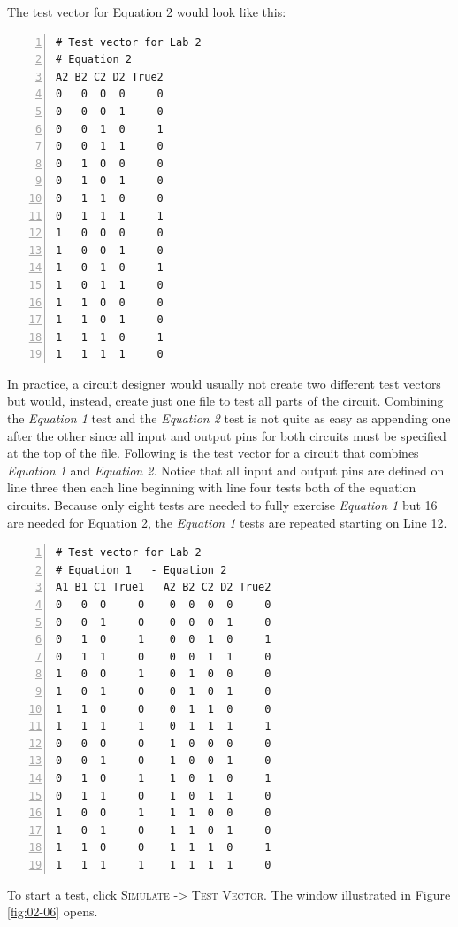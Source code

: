 The test vector for Equation 2 would look like this:

\begin{Verbatim}[frame=lines,
								 numbers=left,
								 xleftmargin=10mm,
								 xrightmargin=10mm]
# Test vector for Lab 2
# Equation 2
A2 B2 C2 D2 True2
0   0  0  0     0
0   0  0  1     0
0   0  1  0     1
0   0  1  1     0
0   1  0  0     0
0   1  0  1     0
0   1  1  0     0
0   1  1  1     1
1   0  0  0     0
1   0  0  1     0
1   0  1  0     1
1   0  1  1     0
1   1  0  0     0
1   1  0  1     0
1   1  1  0     1
1   1  1  1     0
\end{Verbatim}

In practice, a circuit designer would usually not create two different test vectors but would, instead, create just one file to test all parts of the circuit. Combining the \textit{Equation 1} test and the \textit{Equation 2} test is not quite as easy as appending one after the other since all input and output pins for both circuits must be specified at the top of the file. Following is the test vector for a circuit that combines \textit{Equation 1} and \textit{Equation 2}. Notice that all input and output pins are defined on line three then each line beginning with line four tests both of the equation circuits. Because only eight tests are needed to fully exercise \textit{Equation 1} but 16 are needed for Equation 2, the \textit{Equation 1} tests are repeated starting on Line 12.

\begin{Verbatim}[frame=lines,
								 numbers=left,
								 xleftmargin=10mm,
								 xrightmargin=10mm]
# Test vector for Lab 2
# Equation 1   - Equation 2
A1 B1 C1 True1   A2 B2 C2 D2 True2
0   0  0     0    0  0  0  0     0
0   0  1     0    0  0  0  1     0
0   1  0     1    0  0  1  0     1
0   1  1     0    0  0  1  1     0
1   0  0     1    0  1  0  0     0
1   0  1     0    0  1  0  1     0
1   1  0     0    0  1  1  0     0
1   1  1     1    0  1  1  1     1
0   0  0     0    1  0  0  0     0
0   0  1     0    1  0  0  1     0
0   1  0     1    1  0  1  0     1
0   1  1     0    1  0  1  1     0
1   0  0     1    1  1  0  0     0
1   0  1     0    1  1  0  1     0
1   1  0     0    1  1  1  0     1
1   1  1     1    1  1  1  1     0
\end{Verbatim}

To start a test, click \textsc{Simulate -> Test Vector}. The window illustrated in Figure \ref{fig:02-06} opens. 

